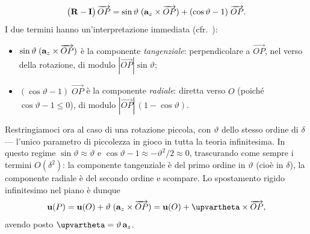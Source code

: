 \begin{equation}\label{eq:R-I_piano}
	\bigl(\mathbf{R} - \mathbf{I}\bigr)\,\overrightarrow{OP}
	= \sin\vartheta\;(\mathbf{a}_z \times \overrightarrow{OP})
	+ (\cos\vartheta - 1)\;\overrightarrow{OP}.
\end{equation}
I due termini hanno un'interpretazione immediata (cfr.~):
\begin{itemize}[nosep]
	\item $\sin\vartheta\;(\mathbf{a}_z \times \overrightarrow{OP})$ è la
	componente \textit{tangenziale}: perpendicolare a $\overrightarrow{OP}$,
	nel verso della rotazione, di modulo $|\overrightarrow{OP}|\sin\vartheta$;
	\item $(\cos\vartheta - 1)\;\overrightarrow{OP}$ è la componente
	\textit{radiale}: diretta verso $O$ (poiché $\cos\vartheta - 1 \leq 0$),
	di modulo $|\overrightarrow{OP}|\,(1-\cos\vartheta)$.
\end{itemize}



Restringiamoci ora al caso di una rotazione piccola, con $\vartheta$ dello stesso ordine di $\delta$ — l'unico parametro di piccolezza in gioco in tutta la teoria infinitesima. In questo regime $\sin\vartheta \approx \vartheta$ e $\cos\vartheta - 1 \approx -\vartheta^2/2 \approx 0$, trascurando come sempre i termini $O(\delta^2)$: la componente tangenziale è del primo ordine in $\vartheta$ (cioè in $\delta$), la componente radiale è del secondo ordine e scompare. Lo spostamento rigido infinitesimo nel piano è dunque
\begin{equation}\label{eq:FFCI_piano_deriv}
	\ub(P) = \ub(O) + \vartheta\;(\ab_z \times \overrightarrow{OP})
	= \ub(O) + \bm{\upvartheta} \times \overrightarrow{OP},
\end{equation}
avendo posto $\bm{\upvartheta} = \vartheta\,\ab_z$.

